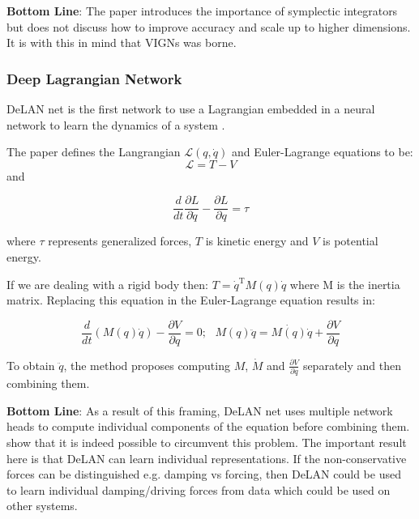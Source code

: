 \documentclass{article}
\begin{document}
\textbf{Bottom Line}: The paper introduces the importance of symplectic integrators but does not discuss how to improve accuracy and scale up to higher dimensions. It is with this in mind that VIGNs was borne.

\subsubsection{Deep Lagrangian Network}

DeLAN net is the first network to use a Lagrangian embedded in a neural network to learn the dynamics of a system \cite{lutter_deep_2019}. 

The paper defines the Langrangian $\mathcal{L} (q,\dot{q})$ and Euler-Lagrange equations to be:
\begin{equation} 
\mathcal{L} = T - V
\end{equation}
and

\begin{equation}
\frac{d}{dt}\frac{\partial L}{\partial \dot{q}} - \frac{\partial L}{\partial q} = \tau
\end{equation}

where $\tau$ represents generalized forces, $T$ is kinetic energy and $V$ is potential energy.

If we are dealing with a rigid body then: $ T = \dot{q}^{\mathrm{T}} M(q) \dot{q} $ where M is the inertia matrix. Replacing this equation in the Euler-Lagrange equation results in:

\begin{equation}
 \frac{d}{dt} (M(q)\dot{q}) - \frac{\partial V}{\partial q} = 0; 
~~~
M(q)\ddot{q} = \dot{M(q)} \dot{q} + \frac{\partial V}{\partial q} 
\end{equation}

To obtain $\ddot{q}$, the method proposes computing $M$, $\dot{M}$ and $\frac{\partial V}{\partial q}$ separately and then combining them.  

\textbf{Bottom Line}: As a result of this framing, DeLAN net uses multiple network heads to compute individual components of the equation before combining them. \cite{cranmer_lagrangian_2020} show that it is indeed possible to circumvent this problem. The important result here is that DeLAN can learn individual representations. If the non-conservative forces can be distinguished e.g. damping vs forcing, then DeLAN could be used to learn individual damping/driving forces from data which could be used on other systems. 
\end{document}
